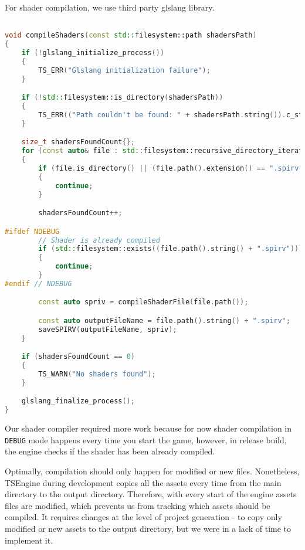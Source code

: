 For shader compilation, we use third party glslang library.
\begin{lstlisting}[language=c++, caption=Shader Compiler implementation(./engine/src/vulkan\_tools/shaders\_compiler.cpp)]

void compileShaders(const std::filesystem::path shadersPath)
{
    if (!glslang_initialize_process())
    {
        TS_ERR("Glslang initialization failure");
    }

    if (!std::filesystem::is_directory(shadersPath))
    {
        TS_ERR(("Path couldn't be found: " + shadersPath.string()).c_str());
    }

    size_t shadersFoundCount{};
    for (const auto& file : std::filesystem::recursive_directory_iterator(shadersPath))
    {
        if (file.is_directory() || (file.path().extension() == ".spirv") || (file.path().extension() == ".h"))
        {
            continue;
        }

        shadersFoundCount++;

#ifdef NDEBUG
        // Shader is already compiled
        if (std::filesystem::exists((file.path().string() + ".spirv")))
        {
            continue;
        }
#endif // NDEBUG

        const auto spriv = compileShaderFile(file.path());

        const auto outputFileName = file.path().string() + ".spirv";
        saveSPIRV(outputFileName, spriv);
    }

    if (shadersFoundCount == 0)
    {
        TS_WARN("No shaders found");
    }

    glslang_finalize_process();
}
\end{lstlisting}
\label{problem_with_shader_compilation}

Our shader compiler required more work because for now shader compilation in \texttt{DEBUG} mode happens every time you start the game, however, in release build, the engine checks if the shader has been already compiled.

Optimally, compilation should only happen for modified or new files. Nonetheless, TSEngine during development copies all the assets every time from the main directory to the output directory. Therefore, with every start of the engine assets files are modified, which prevents us from tracking which assets should be compiled. It requires changes at the level of project generation - to copy only modified or new assets to the output directory, but we were in a lack of time to implement it.

